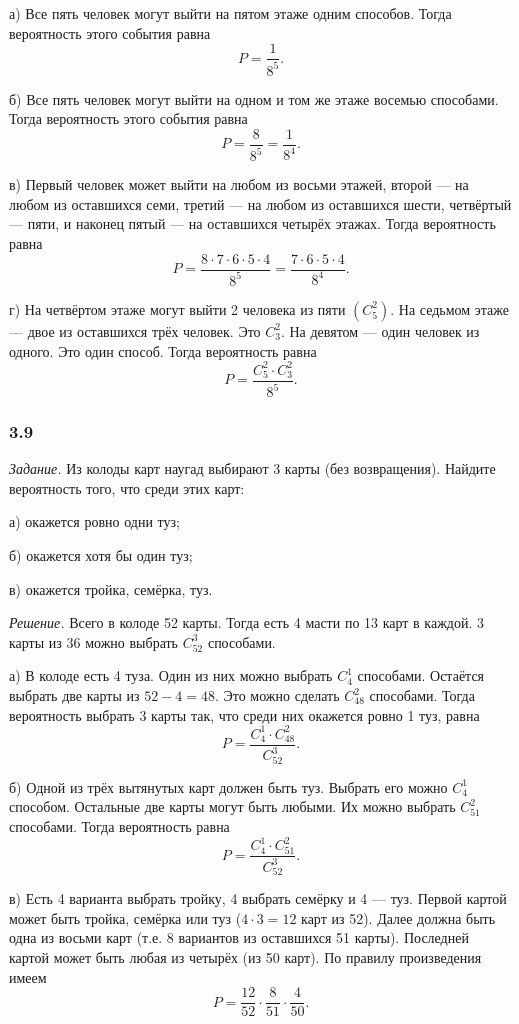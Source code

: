 \documentclass{book}
\begin{document}
а) Все пять человек могут выйти на пятом этаже одним способов.
Тогда вероятность этого события равна
$$P =
\frac{1}{8^5}.$$

б) Все пять человек могут выйти на одном и том же этаже восемью способами.
Тогда вероятность этого события равна
$$P =
\frac{8}{8^5} =
\frac{1}{8^4}.$$

в) Первый человек может выйти на любом из восьми этажей, второй --- на любом из оставшихся семи,
третий --- на любом из оставшихся шести, четвёртый --- пяти, и наконец пятый --- на оставшихся четырёх этажах.
Тогда вероятность равна
$$P =
\frac{8 \cdot 7 \cdot 6 \cdot 5 \cdot 4}{8^5} =
\frac{7 \cdot 6 \cdot 5 \cdot 4}{8^4}.$$

г) На четвёртом этаже могут выйти 2 человека из пяти $ \left( C_5^2 \right) $.
На седьмом этаже --- двое из оставшихся трёх человек.
Это $C_3^2$.
На девятом --- один человек из одного.
Это один способ.
Тогда вероятность равна
$$P =
\frac{C_5^2 \cdot C_3^2}{8^5}.$$

\subsubsection*{3.9}

\textit{Задание.} Из колоды карт наугад выбирают 3 карты (без возвращения).
Найдите вероятность того, что среди этих карт:

а) окажется ровно одни туз;

б) окажется хотя бы один туз;

в) окажется тройка, семёрка, туз.

\textit{Решение.} Всего в колоде 52 карты.
Тогда есть 4 масти по 13 карт в каждой.
3 карты из 36 можно выбрать $C_{52}^3$ способами.

а) В колоде есть 4 туза.
Один из них можно выбрать $C_4^1$ способами.
Остаётся выбрать две карты из $52-4=48$.
Это можно сделать $C_{48}^2$ способами.
Тогда вероятность выбрать 3 карты так, что среди них окажется ровно 1 туз, равна
$$P =
\frac{C_4^1 \cdot C_{48}^2}{C_{52}^3}.$$

б) Одной из трёх вытянутых карт должен быть туз.
Выбрать его можно $C_4^1$ способом.
Остальные две карты могут быть любыми.
Их можно выбрать $C_{51}^2$ способами.
Тогда вероятность равна
$$P =
\frac{C_4^1 \cdot C_{51}^2}{C_{52}^3}.$$

в) Есть 4 варианта выбрать тройку, 4 выбрать семёрку и 4 --- туз.
Первой картой может быть тройка, семёрка или туз ($4 \cdot 3 = 12$ карт из 52).
Далее должна быть одна из восьми карт (т.е. 8 вариантов из оставшихся 51 карты).
Последней картой может быть любая из четырёх (из 50 карт).
По правилу произведения имеем
$$P =
\frac{12}{52} \cdot \frac{8}{51} \cdot \frac{4}{50}.$$
\end{document}
